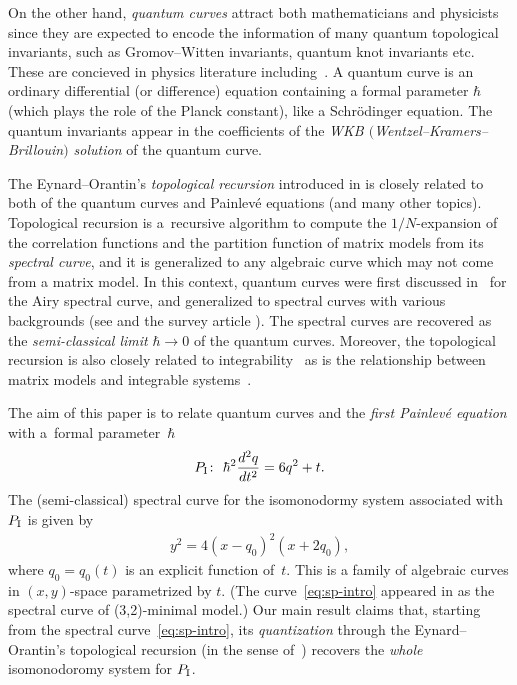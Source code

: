 \documentclass[pdftex]{sigma}
\theoremstyle{definition}
\numberwithin{equation}{section}
\def\PI{P_{\rm I}}
\begin{document}
On the other hand, {\em quantum curves} attract both mathematicians
and physicists since they are expected to encode
the information of many quantum topological invariants, such as
Gromov--Witten invariants, quantum knot invariants etc.
These are concieved in physics literature inclu\-ding~\cite{Agana, Agana2, DFM, GS}.
A quantum curve is an ordinary dif\/ferential (or dif\/ference)
equation containing a formal parameter $\hbar$
(which plays the role of the Planck constant),
like a Schr{\"o}dinger equation. The quantum invariants appear
in the coef\/f\/icients of the
{\em WKB $($Wentzel--Kramers--Brillouin$)$ solution}
of the quantum curve.

The Eynard--Orantin's {\em topological recursion}
introduced in \cite{EO07} is closely related to both of
the quantum curves and Painlev\'e equations (and many other topics).
Topological recursion is a~recursive algorithm to
compute the $1/N$-expansion of the correlation functions
and the partition function of matrix models from its
{\em spectral curve}, and it is generalized to any algebraic curve
which may not come from a matrix model.
In this context, quantum curves were f\/irst discussed in~\cite{BE}
for the Airy spectral curve, and generalized to spectral curves
with various backgrounds (see \cite{DM14, DM14-2, DBMNPS, GS, MS12}
and the survey article \cite{Nor}).
The spectral curves are recovered as the {\em semi-classical limit}
$\hbar \rightarrow 0$ of the quantum curves.
Moreover, the topological recursion is also closely related to
integrability~\cite{BBE12, Borot-Eynard, IM}
as is the relationship between matrix models
and integrable systems~\cite{DGZJ, Kont}.

The aim of this paper is to relate quantum curves and
the {\em first Painlev\'e equation} with a~formal parameter~$\hbar$
\begin{gather*}
\PI\colon \  \hbar^{2} \frac{d^{2}q}{dt^{2}} =
6q^{2} + t.
\end{gather*}
The (semi-classical) spectral curve for the isomonodormy
system associated with $\PI$ is given by
\begin{gather} \label{eq:sp-intro}
y^{2} = 4(x-q_{0})^{2}(x+2q_{0}),
\end{gather}
where $q_{0} = q_{0}(t)$ is an explicit function of~$t$.
This is a family of algebraic curves in $(x,y)$-space
parametrized by $t$. (The curve~\eqref{eq:sp-intro}
appeared in \cite[Section~10.6]{EO07} as the spectral curve of
(3,2)-minimal model.)
Our main result claims that,
starting from the spectral curve~\eqref{eq:sp-intro},
its {\em quantization} through the Eynard--Orantin's topological
recursion (in the sense of~\cite{DM14, DM14-2})
recovers the {\em whole} isomonodoromy system for $\PI$.
\end{document}
